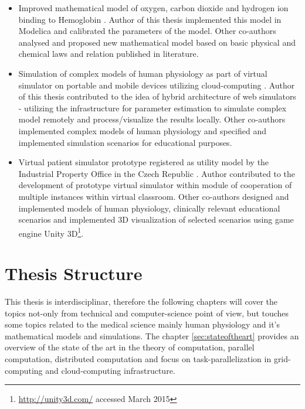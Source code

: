 \begin{itemize}
\item Improved mathematical model of oxygen, carbon dioxide and hydrogen ion binding to Hemoglobin \cite{Matejak2014sj}. Author of this thesis implemented this model in Modelica and calibrated the parameters of the model. Other co-authors analysed and proposed new mathematical model based on basic physical and chemical laws and relation published in literature.
\item Simulation of complex models of human physiology as part of virtual simulator on portable and mobile devices utilizing cloud-computing \cite{Kulhanek2013c,Kulhanek2013b}. Author of this thesis contributed to the idea of hybrid architecture of web simulators - utilizing the infrastructure for parameter estimation to simulate complex model remotely and process/visualize the results locally. Other co-authors implemented complex models of human physiology and specified and implemented simulation scenarios for educational purposes.
\item Virtual patient simulator prototype registered as utility model by the Industrial Property Office in the Czech Republic \cite{Kofranek2014a}. Author contributed to the development of prototype virtual simulator within module of cooperation of multiple instances within virtual classroom. Other co-authors designed and implemented models of human physiology, clinically relevant educational scenarios and implemented 3D visualization of selected scenarios using game engine Unity 3D\footnote{\url{http://unity3d.com/} accessed March 2015}.
\end{itemize}

\section{Thesis Structure}
This thesis is interdisciplinar, therefore the following chapters will cover the topics not-only from technical and computer-science point of view, but touches some topics related to the medical science mainly human physiology and it's mathematical models and simulations.
The chapter \ref{sec:stateoftheart} provides an overview of the state of the art in the theory of computation, parallel computation, distributed computation and focus on task-parallelization in grid-computing and cloud-computing infrastructure. 



